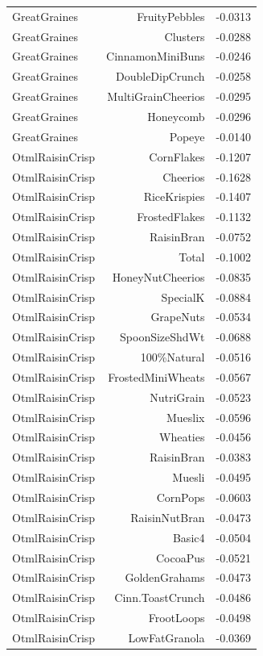 \begin{longtable}{@{}lrr@{}}
GreatGraines & FruityPebbles & -0.0313 \\
GreatGraines & Clusters & -0.0288 \\
GreatGraines & CinnamonMiniBuns & -0.0246 \\
GreatGraines & DoubleDipCrunch & -0.0258 \\
GreatGraines & MultiGrainCheerios & -0.0295 \\
GreatGraines & Honeycomb & -0.0296 \\
GreatGraines & Popeye & -0.0140 \\
OtmlRaisinCrisp & CornFlakes & -0.1207 \\
OtmlRaisinCrisp & Cheerios & -0.1628 \\
OtmlRaisinCrisp & RiceKrispies & -0.1407 \\
OtmlRaisinCrisp & FrostedFlakes & -0.1132 \\
OtmlRaisinCrisp & RaisinBran & -0.0752 \\
OtmlRaisinCrisp & Total & -0.1002 \\
OtmlRaisinCrisp & HoneyNutCheerios & -0.0835 \\
OtmlRaisinCrisp & SpecialK & -0.0884 \\
OtmlRaisinCrisp & GrapeNuts & -0.0534 \\
OtmlRaisinCrisp & SpoonSizeShdWt & -0.0688 \\
OtmlRaisinCrisp & 100\%Natural & -0.0516 \\
OtmlRaisinCrisp & FrostedMiniWheats & -0.0567 \\
OtmlRaisinCrisp & NutriGrain & -0.0523 \\
OtmlRaisinCrisp & Mueslix & -0.0596 \\
OtmlRaisinCrisp & Wheaties & -0.0456 \\
OtmlRaisinCrisp & RaisinBran & -0.0383 \\
OtmlRaisinCrisp & Muesli & -0.0495 \\
OtmlRaisinCrisp & CornPops & -0.0603 \\
OtmlRaisinCrisp & RaisinNutBran & -0.0473 \\
OtmlRaisinCrisp & Basic4 & -0.0504 \\
OtmlRaisinCrisp & CocoaPus & -0.0521 \\
OtmlRaisinCrisp & GoldenGrahams & -0.0473 \\
OtmlRaisinCrisp & Cinn.ToastCrunch & -0.0486 \\
OtmlRaisinCrisp & FrootLoops & -0.0498 \\
OtmlRaisinCrisp & LowFatGranola & -0.0369 \\

\end{longtable}
